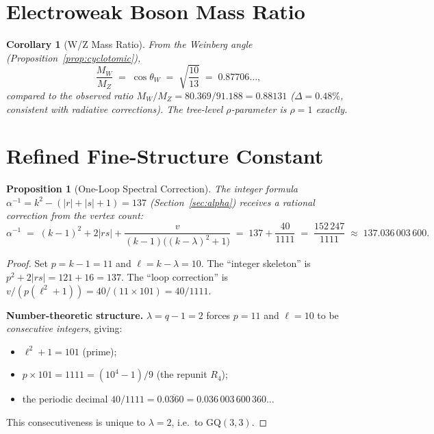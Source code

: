 \documentclass[12pt,a4paper]{article}
\newtheorem{proposition}[theorem]{Proposition}
\newtheorem{corollary}[theorem]{Corollary}
\begin{document}
\section{Electroweak Boson Mass Ratio}
\label{sec:WZ}

\begin{corollary}[W/Z Mass Ratio]\label{cor:WZ}
From the Weinberg angle (Proposition~\ref{prop:cyclotomic}),
\[
  \frac{M_W}{M_Z} \;=\; \cos\theta_W
  \;=\; \sqrt{\frac{10}{13}}
  \;=\; 0.87706\ldots,
\]
compared to the observed ratio
$M_W/M_Z = 80.369/91.188 = 0.88131$
($\Delta = 0.48\%$, consistent with radiative corrections).
The tree-level $\rho$-parameter is $\rho = 1$ exactly.
\end{corollary}

\section{Refined Fine-Structure Constant}
\label{sec:alpha-refined}

\begin{proposition}[One-Loop Spectral Correction]\label{prop:alpha-refined}
The integer formula $\alpha^{-1} = k^2 - (|r|+|s|+1) = 137$
(Section~\ref{sec:alpha}) receives a rational correction from
the vertex count:
\[
  \boxed{\alpha^{-1}
  \;=\; (k{-}1)^2 + 2|rs| + \frac{v}{(k{-}1)\bigl((k{-}\lambda)^2+1\bigr)}
  \;=\; 137 + \frac{40}{1111}
  \;=\; \frac{152\,247}{1111}
  \;\approx\; 137.036\,003\,600.}
\]
\end{proposition}

\begin{proof}
Set $p = k - 1 = 11$ and $\ell = k - \lambda = 10$.  The
``integer skeleton'' is
$p^2 + 2|rs| = 121 + 16 = 137$.
The ``loop correction'' is
$v / (p(\ell^2 + 1)) = 40 / (11 \times 101) = 40/1111$.

\medskip\noindent
\textbf{Number-theoretic structure.}
$\lambda = q - 1 = 2$ forces $p = 11$ and $\ell = 10$
to be \emph{consecutive integers}, giving:
\begin{itemize}
  \item $\ell^2 + 1 = 101$ (prime);
  \item $p \times 101 = 1111 = (10^4 - 1)/9$ (the repunit $R_4$);
  \item the periodic decimal
        $40/1111 = 0.\overline{0360} = 0.036\,003\,600\,360\ldots$
\end{itemize}
This consecutiveness is unique to $\lambda = 2$,
i.e.\ to $\mathrm{GQ}(3,3)$.
\end{proof}
\end{document}
